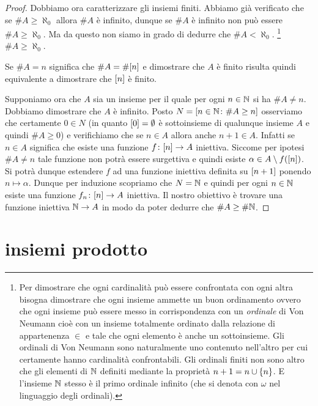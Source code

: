 \begin{proof}
Dobbiamo ora caratterizzare gli insiemi finiti.
Abbiamo già verificato che se $\#A \ge \aleph_0$ 
allora $\#A$ è infinito, dunque se $\#A$ è infinito 
non può essere $\#A \ge \aleph_0$.
Ma da questo non siamo in grado di dedurre che $\#A < \aleph_0$.%
\footnote{%
Per dimostrare che ogni cardinalità può essere confrontata 
con ogni altra bisogna dimostrare che ogni insieme ammette un buon 
ordinamento ovvero 
che ogni insieme può essere messo in corrispondenza con un 
\emph{ordinale} di Von Neumann cioè con un insieme totalmente 
ordinato dalla relazione di appartenenza $\in$ e tale 
che ogni elemento è anche un sottoinsieme.
Gli ordinali di Von Neumann sono naturalmente uno contenuto 
nell'altro per cui certamente hanno cardinalità confrontabili.
Gli ordinali finiti non sono altro che gli elementi di $\mathbb N$ 
definiti mediante la proprietà $n+1 = n \cup {\left\{ n \right\}}$.
E l'insieme $\mathbb N$ stesso è il primo ordinale infinito (che si denota 
con $\omega$ nel linguaggio degli ordinali).
}%
$\#A \ge \aleph_0$.


Se $\#A = n$ significa che $\#A = \#{\left[ n \right]}$ e dimostrare 
che $A$ è finito risulta quindi equivalente a dimostrare 
che ${\left[ n \right]}$ è finito. 



Supponiamo ora che $A$ sia un insieme per il quale per ogni $n\in \mathbb N$ 
si ha $\#A \neq n$. Dobbiamo dimostrare che $A$ è infinito.
Posto $N={\left[ n\in\mathbb N\colon \#A\ge n \right]}$ osserviamo che certamente 
$0\in N$ (in quanto ${\left[ 0 \right]}=\emptyset$ è sottoinsieme di qualunque 
insieme $A$ e quindi $\#A\ge 0$) e verifichiamo che se $n\in A$ allora 
anche $n+1\in A$. Infatti se $n\in A$ significa che esiste 
una funzione $f\colon {\left[ n \right]}\to A$ iniettiva. 
Siccome per ipotesi $\#A\neq n$ tale funzione non potrà essere surgettiva 
e quindi esiste $\alpha \in A\setminus f({\left[ n \right]})$. 
Si potrà dunque estendere $f$ ad una funzione iniettiva definita 
su ${\left[ n+1 \right]}$ ponendo $n\mapsto \alpha$.
Dunque per induzione scopriamo che $N=\mathbb N$ e quindi 
per ogni $n\in \mathbb N$ esiste una funzione $f_n\colon{\left[ n \right]}\to A$ 
iniettiva.
Il nostro obiettivo è trovare una funzione iniettiva $\mathbb N\to A$ 
in modo da poter dedurre che $\#A\ge \#\mathbb N$.

\end{proof}

\section{insiemi prodotto}

